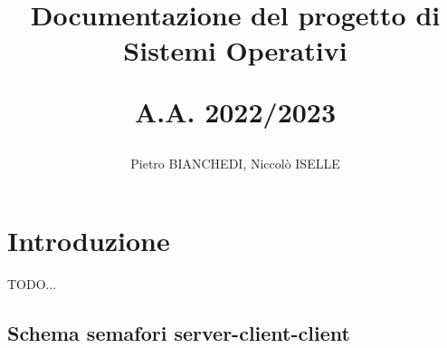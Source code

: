 \documentclass[a4paper,12pt,twoside]{report}
\begin{document}
\title{Documentazione del progetto di Sistemi Operativi

A.A. 2022/2023}
\author{Pietro BIANCHEDI, Niccolò ISELLE}
\date{}
\maketitle
\tableofcontents

\chapter{Introduzione}
TODO...
\section{Schema semafori server-client-client}
\end{document}
